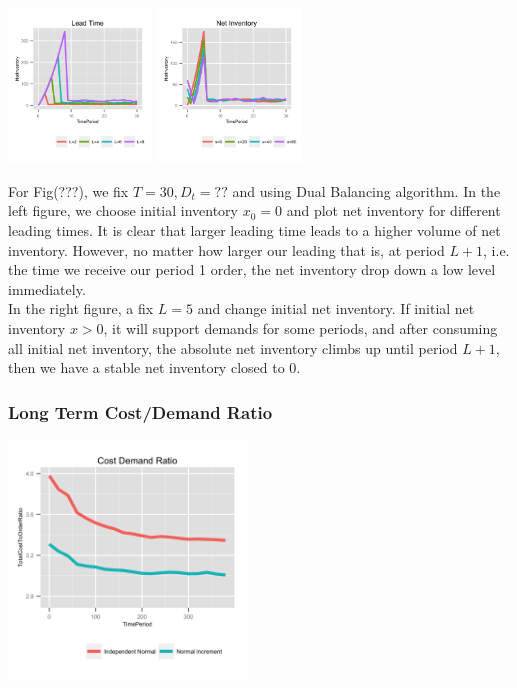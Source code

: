 \documentclass[twoside]{article}
\begin{document}
\begin{multicols}{2}
  \includegraphics[width=1.5in]{figures/LeadTime.png}
  \includegraphics[width=1.5in]{figures/NetInventory.png}

For Fig(???), we fix $T=30, D_t=??$ and using Dual Balancing algorithm. In the left figure, we choose initial inventory $x_0 = 0$ and plot net inventory for different leading times. It is clear that larger leading time leads to a higher volume of net inventory. However, no matter how larger our leading that is, at period $L+1$, i.e. the time we receive our period 1 order, the net inventory drop down a low level immediately.\\
In the right figure, a fix $L = 5$ and change initial net inventory. If initial net inventory $x > 0$, it will support demands for some periods, and after consuming all initial net inventory, the absolute net inventory climbs up until period $L+1$, then we have a stable net inventory closed to 0.\\

\subsubsection{Long Term Cost/Demand Ratio}

  \includegraphics[width=2.5in]{figures/TotalCostToOrderRatio.png}


\end{multicols}
\end{document}
